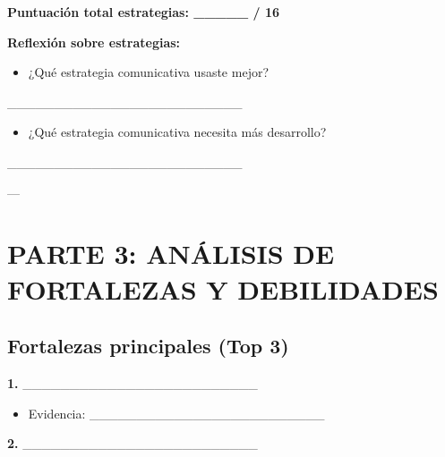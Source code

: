 \documentclass[a4paper,11pt]{article}
\begin{document}
\vspace{0.2cm}

\textbf{Puntuación total estrategias: _____ / 16}

\vspace{0.2cm}

\textbf{Reflexión sobre estrategias:}

\begin{itemize}

  \item ¿Qué estrategia comunicativa usaste mejor?

\end{itemize}

_________________________

\begin{itemize}

  \item ¿Qué estrategia comunicativa necesita más desarrollo?

\end{itemize}

_________________________

\vspace{0.2cm}

---

\vspace{0.2cm}

\section{PARTE 3: ANÁLISIS DE FORTALEZAS Y DEBILIDADES}

\vspace{0.2cm}

\subsection{Fortalezas principales (Top 3)}

\vspace{0.2cm}

\textbf{1. } _________________________

\begin{itemize}

  \item Evidencia: _________________________

\end{itemize}

\vspace{0.2cm}

\textbf{2. } _________________________
\end{document}
